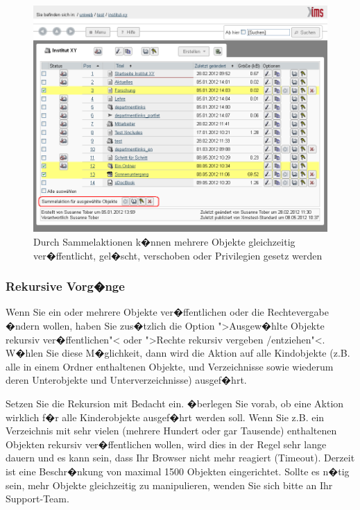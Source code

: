 \begin{figure}[!ht]
	\centering
		\includegraphics[width=\textwidth]{./images/sammelaktionen.png}
	\caption{Durch Sammelaktionen k�nnen mehrere Objekte gleichzeitig ver�ffentlicht, gel�scht, verschoben oder Privilegien gesetz werden}
	\label{fig:sammelaktionen}
\end{figure}

\subsubsection{Rekursive Vorg�nge}
Wenn Sie ein oder mehrere Objekte ver�ffentlichen oder die Rechtevergabe �ndern wollen, haben Sie zus�tzlich die Option ">Ausgew�hlte Objekte rekursiv ver�ffentlichen"<  oder ">Rechte rekursiv vergeben /entziehen"<. W�hlen Sie diese M�glichkeit, dann wird die Aktion auf alle Kindobjekte (z.B. alle in einem Ordner enthaltenen Objekte, und Verzeichnisse sowie wiederum deren Unterobjekte und Unterverzeichnisse) ausgef�hrt.

\begin{Hinweis}
  Setzen Sie die Rekursion mit Bedacht ein. �berlegen Sie vorab, ob eine Aktion wirklich f�r alle Kinderobjekte ausgef�hrt werden soll. Wenn Sie z.B. ein Verzeichnis mit sehr vielen (mehrere Hundert oder gar Tausende) enthaltenen Objekten rekursiv ver�ffentlichen wollen, wird dies in der Regel sehr lange dauern und es kann sein, dass Ihr Browser nicht mehr reagiert (Timeout). Derzeit ist eine Beschr�nkung von maximal 1500 Objekten eingerichtet. Sollte es n�tig sein, mehr Objekte gleichzeitig zu manipulieren, wenden Sie sich bitte an Ihr Support-Team.
\end{Hinweis}

